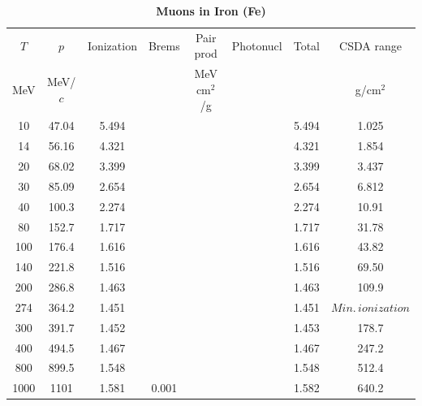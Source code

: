 \begin{table}
\caption*{\textbf{Muons in Iron (Fe)}}
\begin{tabularx}{\textwidth}{cccccccc}
\hline \hline
$T$ & $p$ & Ionization & Brems & Pair prod & Photonucl & Total & CSDA range\vspace{-12pt}\\
MeV & MeV/$c$ & \multicolumn{2}{c}{\sout{\hspace{3cm}}} & MeV cm$^2$/g & \multicolumn{2}{c}{\sout{\hspace{3cm}}} & g/cm$^2$\\ \hline
10 & 47.04 & 5.494 & &&& 5.494 & 1.025\vspace{-12pt}\\
14 & 56.16 & 4.321 & & & & 4.321 & 1.854\vspace{-12pt}\\
20 & 68.02 & 3.399 &  &   &  			& 3.399 & 3.437 \vspace{-12pt}\\
30 & 85.09 & 2.654 &  &  &  			& 2.654 & 6.812 \vspace{-12pt}\\
40 & 100.3 & 2.274 &  &  &  			& 2.274 & 10.91 \vspace{-12pt}\\
80 & 152.7 & 1.717 &  &  &  			& 1.717 & 31.78 \vspace{-12pt}\\
100 & 176.4 & 1.616 & &   &  			& 1.616 & 43.82 \vspace{-12pt}\\
140 & 221.8 & 1.516 & &   &  			& 1.516 & 69.50 \vspace{-12pt}\\
200 & 286.8 & 1.463 & &   &  			& 1.463 & 109.9 \vspace{-12pt}\\
274 & 364.2 & 1.451 & &   &  			& 1.451 & $Min.\, ionization$ \vspace{-12pt}\\
300 & 391.7 & 1.452 & &   &  			& 1.453 & 178.7 \vspace{-12pt}\\
400 & 494.5 & 1.467 & &   &  			& 1.467 & 247.2 \vspace{-12pt}\\
800 & 899.5 & 1.548 & &   &  			& 1.548 & 512.4 \vspace{-12pt}\\
1000 & 1101 & 1.581  & 0.001 & &  		& 1.582 & 640.2 \vspace{-12pt}\\

\end{tabularx}
\end{table}
